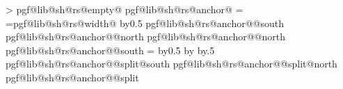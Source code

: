 {{            %
            \pgfextract@process{}%
            \addtosavedmacro\centerpoint%
            \pgfmathloop%
                \ifnum\pgfmathcounter>\parts%
                \else%
                    \pgf@lib@sh@getalpha\pgf@lib@sh@rs@number{\pgfmathcounter}%
                    \expandafter\ifx\csname pgf@lib@sh@rs@empty@\pgf@lib@sh@rs@number\endcsname\pgfutil@empty%
                    \else%
                        \csname pgf@lib@sh@rs@anchor@\pgf@lib@sh@rs@number\endcsname%
                        \pgf@xa=\pgf@x%
                        \pgf@xb=\csname pgf@lib@sh@rs@width@\pgf@lib@sh@rs@number\endcsname\relax%
                        \advance\pgf@xa by0.5\pgf@xb%
                        \expandafter\pgfextract@process\csname pgf@lib@sh@rs@anchor@\pgf@lib@sh@rs@number @south\endcsname{%
                            \southwest%
                            \pgf@x=\pgf@xa%
                        }%
                        \expandafter\pgfextract@process\csname pgf@lib@sh@rs@anchor@\pgf@lib@sh@rs@number @north\endcsname{%
                            \northeast%
                            \pgf@x=\pgf@xa%
                        }%
                        \expandafter\addtosavedmacro\csname pgf@lib@sh@rs@anchor@\pgf@lib@sh@rs@number @north\endcsname%
                        \expandafter\addtosavedmacro\csname pgf@lib@sh@rs@anchor@\pgf@lib@sh@rs@number @south\endcsname%
                        \ifnum\pgfmathcounter=\parts%
                        \else%
                            \advance\pgf@xa by0.5\pgf@xb%
                            \advance\pgf@xa by\innerxsep\relax%
                            \advance\pgf@xa by.5\pgflinewidth%
                            \expandafter\pgfextract@process\csname pgf@lib@sh@rs@anchor@\pgf@lib@sh@rs@number @split@south\endcsname{%
                                \southwest%
                                \pgf@x=\pgf@xa%
                            }%
                            \expandafter\pgfextract@process\csname pgf@lib@sh@rs@anchor@\pgf@lib@sh@rs@number @split@north\endcsname{%
                                \northeast%
                                \pgf@x=\pgf@xa%
                            }%
                            \expandafter\pgfextract@process\csname pgf@lib@sh@rs@anchor@\pgf@lib@sh@rs@number @split\endcsname{%
                                \centerpoint%
                                \pgf@x=\pgf@xa%
}}}
